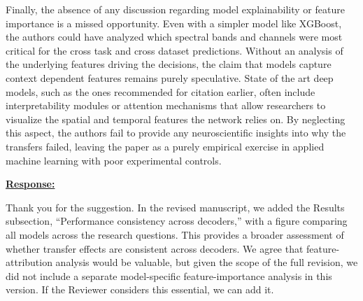 \documentclass{article}
\begin{document}
\begin{cmt}{}{}

Finally, the absence of any discussion regarding model explainability or feature
importance is a missed opportunity. Even with a simpler model like XGBoost, the
authors could have analyzed which spectral bands and channels were most critical
for the cross task and cross dataset predictions. Without an analysis of the
underlying features driving the decisions, the claim that models capture context
dependent features remains purely speculative. State of the art deep models,
such as the ones recommended for citation earlier, often include interpretability
modules or attention mechanisms that allow researchers to visualize the spatial
and temporal features the network relies on. By neglecting this aspect, the
authors fail to provide any neuroscientific insights into why the transfers
failed, leaving the paper as a purely empirical exercise in applied machine
learning with poor experimental controls.

\end{cmt}
\vspace{0.1cm}
\noindent
\underline{\textbf{Response:}}
\vspace{0.2cm}

Thank you for the suggestion. In the revised manuscript, we added the Results
subsection, ``Performance consistency across decoders,'' with a figure comparing
all models across the research questions. This provides a broader assessment of
whether transfer effects are consistent across decoders. We agree that
feature-attribution analysis would be valuable, but given the scope of the full
revision, we did not include a separate model-specific feature-importance
analysis in this version. If the Reviewer considers this essential, we can add
it.

\vspace{0.3cm}
\end{document}
